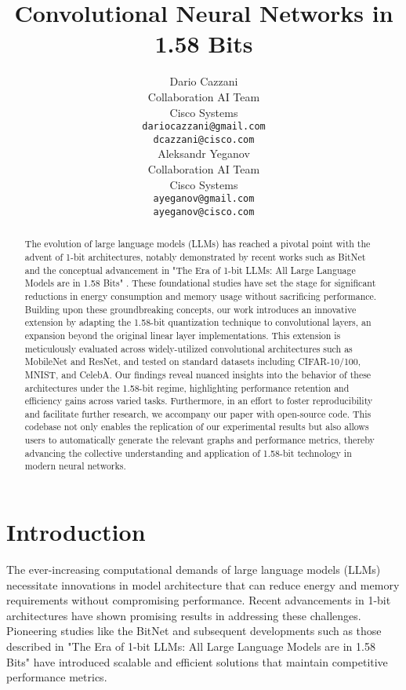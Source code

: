 \documentclass{article}
\title{Convolutional Neural Networks in 1.58 Bits}
\author{%
  Dario Cazzani \\
  Collaboration AI Team \\
  Cisco Systems \\
  \texttt{dariocazzani@gmail.com} \\
  \texttt{dcazzani@cisco.com} \\
  \And
  Aleksandr Yeganov \\
  Collaboration AI Team \\
  Cisco Systems \\
  \texttt{ayeganov@gmail.com} \\
  \texttt{ayeganov@cisco.com}
}
\begin{document}
\maketitle

\begin{abstract}
  The evolution of large language models (LLMs) has reached a pivotal point with the advent of 1-bit architectures, notably demonstrated by recent works such as BitNet \cite{wang2023bitnet} and the conceptual advancement in "The Era of 1-bit LLMs: All Large Language Models are in 1.58 Bits" \cite{ma2024era}. These foundational studies have set the stage for significant reductions in energy consumption and memory usage without sacrificing performance. Building upon these groundbreaking concepts, our work introduces an innovative extension by adapting the 1.58-bit quantization technique to convolutional layers, an expansion beyond the original linear layer implementations. This extension is meticulously evaluated across widely-utilized convolutional architectures such as MobileNet and ResNet, and tested on standard datasets including CIFAR-10/100, MNIST, and CelebA. Our findings reveal nuanced insights into the behavior of these architectures under the 1.58-bit regime, highlighting performance retention and efficiency gains across varied tasks. Furthermore, in an effort to foster reproducibility and facilitate further research, we accompany our paper with open-source code. This codebase not only enables the replication of our experimental results but also allows users to automatically generate the relevant graphs and performance metrics, thereby advancing the collective understanding and application of 1.58-bit technology in modern neural networks.
\end{abstract}


\section{Introduction}

The ever-increasing computational demands of large language models (LLMs) necessitate innovations in model architecture that can reduce energy and memory requirements without compromising performance. Recent advancements in 1-bit architectures have shown promising results in addressing these challenges. Pioneering studies like the BitNet \cite{wang2023bitnet} and subsequent developments such as those described in "The Era of 1-bit LLMs: All Large Language Models are in 1.58 Bits" \cite{ma2024era} have introduced scalable and efficient solutions that maintain competitive performance metrics.
\end{document}
